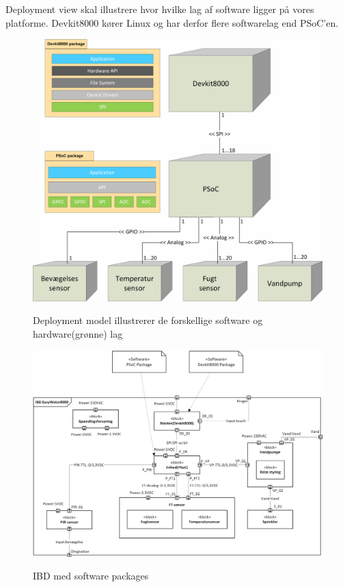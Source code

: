 
Deployment view skal illustrere hvor hvilke lag af software ligger på vores platforme. Devkit8000 kører Linux og har derfor flere softwarelag end PSoC'en.
 
\vspace{15 mm}

\begin{figure}[htbp] \centering
{\includegraphics[scale=0.7]{filer/systemarkitektur/Deployment_model}}
\caption{Deployment model illustrerer de forskellige software og hardware(grønne) lag}
\label{fig:Deployment Model}
\end{figure}

\clearpage

\begin{figure}[!htbp] \centering
{\includegraphics[scale=0.7]{filer/systemarkitektur/IBD_deployment}}
\caption{IBD med software packages}
\label{fig:IBD deployment}
\end{figure}

